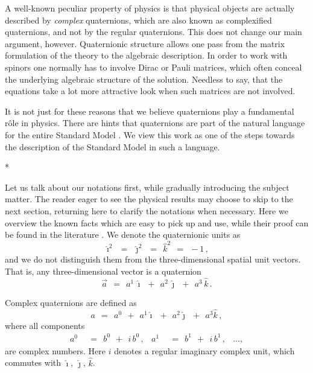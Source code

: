 \documentclass[epsfig,12pt]{article}
\newcommand{\ii}{\hat\imath}
\newcommand{\jj}{\hat\jmath}
\newcommand{\kk}{\hat k}
\begin{document}
	A well-known peculiar property of physics is that physical objects are actually described by \emph{complex} quaternions,
	which are also known as complexified quaternions, and not by the regular quaternions.
	This does not change our main argument, however.
	Quaternionic structure allows one pass from the matrix formulation of the theory to the algebraic description.
	In order to work with spinors one normally has to involve Dirac or Pauli matrices, which often conceal
	the underlying algebraic structure of the solution.
	Needless to say, that the equations take a lot more attractive look when such matrices are not involved.

	It is not just for these reasons that we believe quaternions play a fundamental r\^ole in physics.
	There are hints that quaternions are part of the natural language for the entire Standard Model \cite{Furey:2015tqa}.
	We view this work as one of the steps towards the description of the Standard Model in
	such a language.


\vskip 0.8cm
\centerline{*\qquad\qquad\qquad*\qquad\qquad\qquad*}
\vskip 0.6cm


	Let us talk about our notations first, while gradually introducing the subject matter.
	The reader eager to see the physical results may choose to skip to the next section, returning here
	to clarify the notations when necessary.
	Here we overview the known facts which are easy to pick up and use,
	while their proof can be found in the literature \cite{DeLeo:1997yj}.
	We denote the quaternionic units as
\begin{equation}
	\ii^2	~~=~~	\jj^2	~~=~~	\kk^2	~~=~~	-1\,,
\end{equation}
	and we do not distinguish them from the three-dimensional spatial unit vectors.
	That is, any three-dimensional vector is a quaternion
\begin{equation}
	\vec a	~~=~~	a^1\, \ii  ~~+~~  a^2\, \jj  ~~+~~  a^3\, \kk\,.
\end{equation}

	Complex quaternions are defined as
\begin{equation}
\label{cq}
	a	~~=~~	a^0  ~~+~~  a^1 \ii  ~~+~~  a^2 \jj  ~~+~~  a^3 \kk\,,
\end{equation}
	where all components
\begin{align}
	a^0	& ~~=~~	b^0  ~~+~~  i\,b^0\,,
	&
	a^1	& ~~=~~ b^1  ~~+~~  i\,b^1\,,
	&
	\dots,
\end{align}
	are complex numbers.
	Here $ i $ denotes a regular imaginary complex unit, which commutes with $ \ii $, $ \jj $, $ \kk $.
\end{document}
